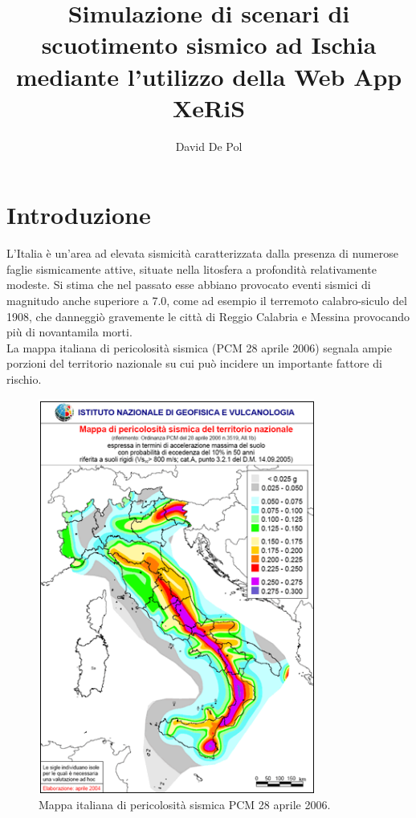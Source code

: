 \documentclass[a4paper,12pt,titlepage]{article}
\begin{document}
\author{David De Pol}
\title{Simulazione di scenari di scuotimento
sismico ad Ischia mediante l'utilizzo
della Web App XeRiS}
\maketitle
\tableofcontents
\clearpage

\section{Introduzione}

L'Italia è un'area ad elevata sismicità caratterizzata dalla presenza di numerose faglie sismicamente attive, situate nella litosfera a profondità relativamente               modeste. Si stima che nel passato esse abbiano provocato eventi 
sismici di magnitudo anche superiore a 7.0, come ad esempio il terremoto
calabro-siculo del 1908, che danneggiò gravemente le città di Reggio Calabria e Messina provocando più di novantamila morti.\\
La mappa italiana di pericolosità sismica (PCM 28 aprile 2006) segnala ampie porzioni del territorio nazionale su cui può incidere un importante fattore di rischio.

\begin{figure}[htbp]
 \centering
 \includegraphics[width=.5\linewidth]{Img/PericolositaSismoNazionale.png}
 \caption{Mappa italiana di pericolosità sismica PCM 28 aprile 2006.}
 \label{fig:PericolositaSismoNazionale1}
\end{figure}
\end{document}
